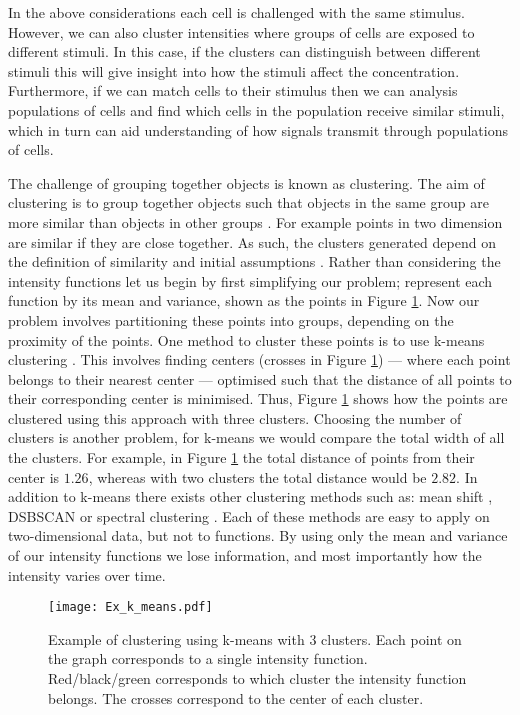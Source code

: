 \documentclass[../main.tex]{subfiles}
\begin{document}
 
 In the above considerations  each cell is challenged with the same stimulus. However, we can also cluster intensities where groups of cells are exposed to different stimuli. In this case, if the clusters can distinguish between different stimuli this will give insight into how the stimuli affect the  concentration. Furthermore, if we can match cells to their stimulus then we can analysis populations of cells and find which cells in the population receive similar stimuli, which in turn can aid understanding of how signals transmit through populations of cells.

The challenge of grouping together objects is known as clustering. The aim of clustering is to group together objects such that objects in the same group are more similar than objects in other groups \cite{Friedman2001}. For example points in two dimension are similar if they are close together. As such, the clusters generated depend on the definition of similarity and initial assumptions \cite{Estivill_Castro_2002}. Rather than considering the intensity functions let us begin by first simplifying our problem; represent each function by its mean and variance, shown as the points in Figure \ref{fig:k_means}. Now our problem involves partitioning these points into groups, depending on the proximity of the points. One method to cluster these points is to use k-means clustering \cite{Arthur_2007}. This involves finding centers (crosses in Figure \ref{fig:k_means}) ---  where each point belongs to their nearest center --- optimised such that the distance of all points to their corresponding center is minimised. Thus, Figure \ref{fig:k_means} shows how the points are clustered using this approach with three clusters. Choosing the number of clusters is another problem, for k-means we would compare the total width of all the clusters. For example, in Figure \ref{fig:k_means} the total distance of points from their center is $ 1.26$, whereas with two clusters the total distance would be $2.82$. In addition to k-means there exists other clustering methods such as: mean shift \cite{Comaniciu_2002}, DSBSCAN \cite{Ester_1996} or spectral clustering \cite{Ng_2001}. Each of these methods are easy to apply on two-dimensional data, but not to functions. By using only the mean and variance of our intensity functions we lose information, and most importantly how the intensity varies over time.  
     \begin{figure}[t!]
   \hrulefill
   \begin{center} 
   {\texttt{[image: Ex\_k\_means.pdf]} }
    \end{center}     
    \caption{Example of clustering using k-means with 3 clusters. Each point on the graph corresponds to a single intensity function. Red/black/green corresponds to which cluster the intensity function belongs. The crosses correspond to the center of each cluster.}
    \label{fig:k_means}
    \hrulefill
    \end{figure}
    
\end{document}
